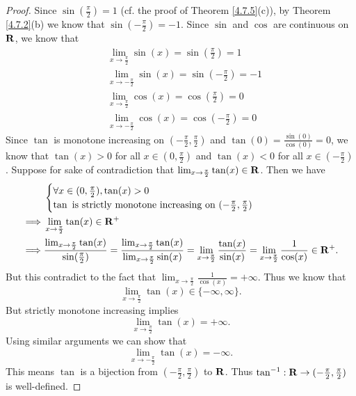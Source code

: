 \begin{proof}
    Since \(\sin(\frac{\pi}{2}) = 1\) (cf. the proof of Theorem \ref{4.7.5}(c)), by Theorem \ref{4.7.2}(b) we know that \(\sin(-\frac{\pi}{2}) = -1\).
    Since \(\sin\) and \(\cos\) are continuous on \(\mathbf{R}\), we know that
    \begin{align*}
         & \lim_{x \to \frac{\pi}{2}} \sin(x) = \sin(\frac{\pi}{2}) = 1    \\
         & \lim_{x \to -\frac{\pi}{2}} \sin(x) = \sin(-\frac{\pi}{2}) = -1 \\
         & \lim_{x \to \frac{\pi}{2}} \cos(x) = \cos(\frac{\pi}{2}) = 0    \\
         & \lim_{x \to -\frac{\pi}{2}} \cos(x) = \cos(-\frac{\pi}{2}) = 0
    \end{align*}
    Since \(\tan\) is monotone increasing on \((-\frac{\pi}{2}, \frac{\pi}{2})\) and \(\tan(0) = \frac{\sin(0)}{\cos(0)} = 0\), we know that \(\tan(x) > 0\) for all \(x \in (0, \frac{\pi}{2})\) and \(\tan(x) < 0\) for all \(x \in (-\frac{\pi}{2})\).
    Suppose for sake of contradiction that \(\lim_{x \to \frac{\pi}{2}} \tan(x) \in \mathbf{R}\).
    Then we have
    \begin{align*}
                 & \begin{cases}
                       \forall x \in (0, \frac{\pi}{2}), \tan(x) > 0 \\
                       \tan \text{ is strictly monotone increasing on } (-\frac{\pi}{2}, \frac{\pi}{2})
                   \end{cases}                                                                                                                                                                              \\
        \implies & \lim_{x \to \frac{\pi}{2}} \tan(x) \in \mathbf{R}^+                                                                                                                                                                                                                  \\
        \implies & \frac{\lim_{x \to \frac{\pi}{2}} \tan(x)}{\sin(\frac{\pi}{2})} = \frac{\lim_{x \to \frac{\pi}{2}} \tan(x)}{\lim_{x \to \frac{\pi}{2}} \sin(x)} = \lim_{x \to \frac{\pi}{2}} \frac{\tan(x)}{\sin(x)} = \lim_{x \to \frac{\pi}{2}} \frac{1}{\cos(x)} \in \mathbf{R}^+.
    \end{align*}
    But this contradict to the fact that \(\lim_{x \to \frac{\pi}{2}} \frac{1}{\cos(x)} = +\infty\).
    Thus we know that
    \[
        \lim_{x \to \frac{\pi}{2}} \tan(x) \in \{-\infty, \infty\}.
    \]
    But strictly monotone increasing implies
    \[
        \lim_{x \to \frac{\pi}{2}} \tan(x) = +\infty.
    \]
    Using similar arguments we can show that
    \[
        \lim_{x \to -\frac{\pi}{2}} \tan(x) = -\infty.
    \]
    This means \(\tan\) is a bijection from \((-\frac{\pi}{2}, \frac{\pi}{2})\) to \(\mathbf{R}\).
    Thus \(\tan^{-1} : \mathbf{R} \to (-\frac{\pi}{2}, \frac{\pi}{2})\) is well-defined.


\end{proof}
